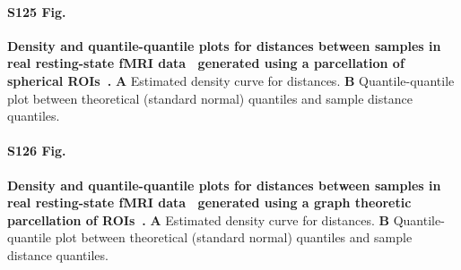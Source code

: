 \documentclass[10pt,letterpaper]{article}
\begin{document}
\paragraph*{S125 Fig.}
\hypertarget{S125_Fig}{
{\bf Density and quantile-quantile plots for distances between samples in real resting-state fMRI data~\cite{t1000} generated using a parcellation of spherical ROIs~\cite{power2011}.} \textbf{A} Estimated density curve for distances. \textbf{B} Quantile-quantile plot between theoretical (standard normal) quantiles and sample distance quantiles.}

\paragraph*{S126 Fig.}
\hypertarget{S126_Fig}{
{\bf Density and quantile-quantile plots for distances between samples in real resting-state fMRI data~\cite{t1000} generated using a graph theoretic parcellation of ROIs~\cite{shen2013}.} \textbf{A} Estimated density curve for distances. \textbf{B} Quantile-quantile plot between theoretical (standard normal) quantiles and sample distance quantiles.}


\nolinenumbers

%
%
% 

%



\end{document}
